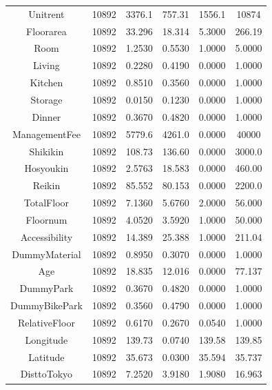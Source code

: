 \documentclass[a4paper, 12pt]{article} %
\begin{document}
\begin{longtable}[c]{cccccc}
\hline
Unitrent & 10892 & 3376.1 & 757.31 & 1556.1 & 10874 \\
Floorarea & 10892 & 33.296 & 18.314 & 5.3000 & 266.19 \\
Room & 10892 & 1.2530 & 0.5530 & 1.0000 & 5.0000 \\
Living & 10892 & 0.2280 & 0.4190 & 0.0000 & 1.0000 \\
Kitchen & 10892 & 0.8510 & 0.3560 & 0.0000 & 1.0000 \\
Storage & 10892 & 0.0150 & 0.1230 & 0.0000 & 1.0000 \\
Dinner & 10892 & 0.3670 & 0.4820 & 0.0000 & 1.0000 \\
ManagementFee & 10892 & 5779.6 & 4261.0 & 0.0000 & 40000 \\
Shikikin & 10892 & 108.73 & 136.60 & 0.0000 & 3000.0 \\
Hosyoukin & 10892 & 2.5763 & 18.583 & 0.0000 & 460.00 \\
Reikin & 10892 & 85.552 & 80.153 & 0.0000 & 2200.0 \\
TotalFloor & 10892 & 7.1360 & 5.6760 & 2.0000 & 56.000 \\
Floornum & 10892 & 4.0520 & 3.5920 & 1.0000 & 50.000 \\
Accessibility & 10892 & 14.389 & 25.388 & 1.0000 & 211.04 \\
DummyMaterial & 10892 & 0.8950 & 0.3070 & 0.0000 & 1.0000 \\
Age & 10892 & 18.835 & 12.016 & 0.0000 & 77.137 \\
DummyPark & 10892 & 0.3670 & 0.4820 & 0.0000 & 1.0000 \\
DummyBikePark & 10892 & 0.3560 & 0.4790 & 0.0000 & 1.0000 \\
RelativeFloor & 10892 &  0.6170 & 0.2670 & 0.0540 & 1.0000 \\
Longitude & 10892 & 139.73 & 0.0740 & 139.58 & 139.85 \\
Latitude & 10892 & 35.673 & 0.0300 & 35.594 & 35.737 \\
DisttoTokyo & 10892 & 7.2520 & 3.9180 & 1.9080 & 16.963 \\
\hline
\end{longtable}
\end{document}
